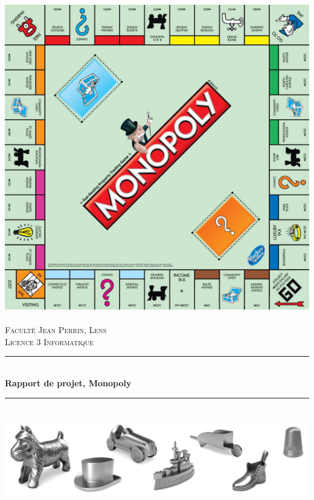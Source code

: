 \documentclass[12pt, openany]{report}
\newcommand{\HRule}{\rule{\linewidth}{0.5mm}}
\begin{document}
\begin{titlepage}
  \begin{sffamily}
  \begin{center}

    \includegraphics[scale=0.1]{monop.jpg}~\\[1.5cm]

    \textsc{\LARGE Faculté Jean Perrin, Lens}\\[2cm]

    \textsc{\Large Licence 3 Informatique}\\[1.5cm]

    \HRule \\[0.4cm]
    { \huge \bfseries Rapport de projet, Monopoly\\[0.4cm] }

    \HRule \\[2cm]
    \includegraphics[scale=0.3]{pions.jpg}
    \\[2cm]


\end{center}
\end{sffamily}
\end{titlepage}
\end{document}
